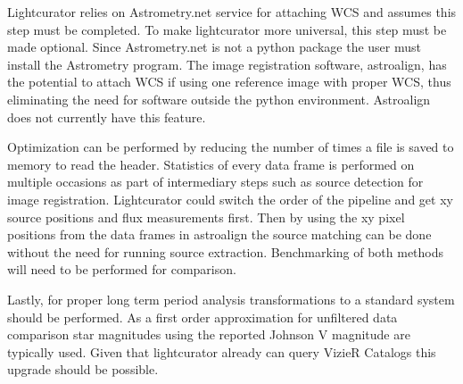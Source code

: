 Lightcurator relies on Astrometry.net service for attaching WCS and assumes this step must be completed.
To make lightcurator more universal, this step must be made optional.
Since Astrometry.net is not a python package the user must install the Astrometry program.
The image registration software, astroalign, has the potential to attach WCS if using one reference image with proper WCS, thus
eliminating the need for software outside the python environment.
Astroalign does not currently have this feature.

Optimization can be performed by reducing the number of times a file is saved to memory to read the header.
Statistics of every data frame is performed on multiple occasions as part of intermediary steps such as source detection for 
image registration. 
Lightcurator could switch the order of the pipeline and get xy source positions and flux measurements first.
Then by using the xy pixel positions from the data frames in astroalign the source matching can be done without 
the need for running source extraction. Benchmarking of both methods will need to be performed for comparison.

Lastly, for proper long term period analysis transformations to a standard system should be performed. 
As a first order approximation for unfiltered data comparison star magnitudes using the reported Johnson V magnitude are typically used.
Given that lightcurator already can query VizieR Catalogs this upgrade should be possible. 

